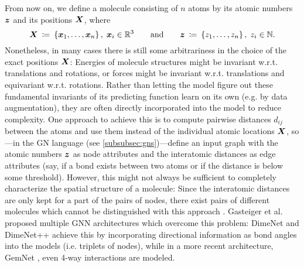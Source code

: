 From now on, we define a molecule consisting of $n$ atoms by its atomic numbers 
$\boldsymbol{z}$ and its positions $\boldsymbol{X}$, where
\[
    \boldsymbol{X} \: \coloneqq \: \left\{\boldsymbol{x}_1, \dots, \boldsymbol{x}_n\right\}, \; \boldsymbol{x}_i \in \mathbb{R}^3
    \qquad \text{and} \qquad 
    \boldsymbol{z} \: \coloneqq \: \left\{z_1, \dots, z_n\right\}, \; z_i \in \mathbb{N} \text{.}
\]
Nonetheless, in many cases there is still some arbitrariness in the choice of the 
exact positions $\boldsymbol{X}$: Energies of molecule structures might be invariant w.r.t. 
translations and rotations, or forces might be invariant w.r.t. 
translations and equivariant w.r.t. rotations. Rather than letting the model figure out
these fundamental invariants of its predicting function learn on its own (e.g. by 
data augmentation), they are often directly incorporated into the model to reduce 
complexity. One approach to achieve this is to compute pairwise distances $d_{ij}$ 
between the atoms and use them instead of the individual atomic locations $\boldsymbol{X}$, 
so---in the GN language (see \ref{subsubsec:gns})---define an input graph with the atomic numbers $\boldsymbol{z}$ as 
node attributes and the interatomic distances as edge attributes (say, if a bond exists
between two atoms or if the distance is below some threshold). However, this might
not always be sufficient to completely characterize the spatial structure of a molecule:
Since the interatomic distances are only kept for a part of the pairs of 
nodes, there exist pairs of different molecules which cannot be
distinguished with this approach \cite[Appendix A]{DBLP:journals/corr/abs-2003-03123}.
Gasteiger et al. proposed multiple GNN architectures which overcome this
problem: DimeNet \cite{DBLP:journals/corr/abs-2003-03123} and 
DimeNet++ \cite{https://doi.org/10.48550/arxiv.2011.14115} achieve this
by incorporating directional information as bond angles into the models
(i.e. triplets of nodes), while in a more recent architecture, GemNet 
\cite{https://doi.org/10.48550/arxiv.2106.08903}, even 4-way interactions are
modeled.




